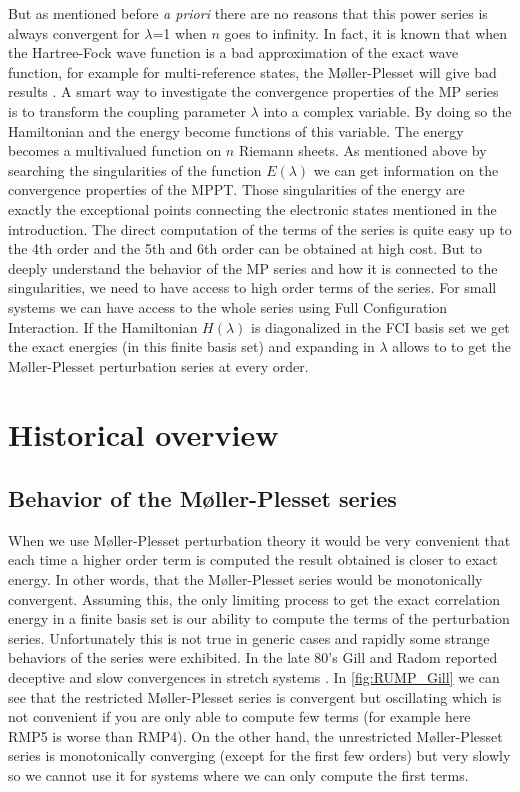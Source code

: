 \documentclass[11pt,a4paper]{article}
\begin{document}
But as mentioned before \textit{a priori} there are no reasons that this power series is always convergent for $\lambda$=1 when $n$ goes to infinity. In fact, it is known that when the Hartree-Fock wave function is a bad approximation of the exact wave function, for example for multi-reference states, the M{\o}ller-Plesset will give bad results \cite{Gill_1986, Gill_1988, Handy_1985, Lepetit_1988}. A smart way to investigate the convergence properties of the MP series is to transform the coupling parameter $\lambda$ into a complex variable. By doing so the Hamiltonian and the energy become functions of this variable. The energy becomes a multivalued function on $n$ Riemann sheets. As mentioned above by searching the singularities of the function $E(\lambda)$ we can get information on the convergence properties of the MPPT. Those singularities of the energy are exactly the exceptional points connecting the electronic states mentioned in the introduction. The direct computation of the terms of the series is quite easy up to the 4th order and the 5th and 6th order can be obtained at high cost. But to deeply understand the behavior of the MP series and how it is connected to the singularities, we need to have access to high order terms of the series. For small systems we can have access to the whole series using Full Configuration Interaction. If the Hamiltonian $H(\lambda)$ is diagonalized in the FCI basis set we get the exact energies (in this finite basis set) and expanding in $\lambda$ allows to to get the M{\o}ller-Plesset perturbation series at every order.

\section{Historical overview}

\subsection{Behavior of the M{\o}ller-Plesset series}

When we use M{\o}ller-Plesset perturbation theory it would be very convenient that each time a higher order term is computed the result obtained is closer to exact energy. In other words, that the M{\o}ller-Plesset series would be monotonically convergent. Assuming this, the only limiting process to get the exact correlation energy in a finite basis set is our ability to compute the terms of the perturbation series.
Unfortunately this is not true in generic cases and rapidly some strange behaviors of the series were exhibited. In the late 80's Gill and Radom reported deceptive and slow convergences in stretch systems \cite{Gill_1986, Gill_1988, Handy_1985, Lepetit_1988}. 
In \autoref{fig:RUMP_Gill} we can see that the restricted M{\o}ller-Plesset series is convergent but oscillating which is not convenient if you are only able to compute few terms (for example here RMP5 is worse than RMP4). 
On the other hand, the unrestricted M{\o}ller-Plesset series is monotonically converging (except for the first few orders) but very slowly so we cannot use it for systems where we can only compute the first terms.
\end{document}
